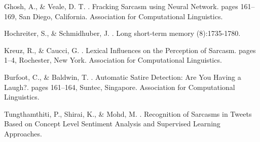 \documentclass[11pt]{article}
\begin{document}
\begin{thebibliography}{}

Ghosh, A., \& Veale, D. T.
.
\newblock Fracking Sarcasm using Neural Network.
\newblock pages 161–169, San Diego, California. Association for Computational Linguistics.

Hochreiter, S., \& Schmidhuber, J.
.
\newblock Long short-term memory
(8):1735-1780.

Kreuz, R., \& Caucci, G.
.
\newblock Lexical Influences on the Perception of Sarcasm.
\newblock pages 1–4, Rochester, New York. Association for Computational Linguistics.

Burfoot, C., \& Baldwin, T.
.
\newblock Automatic Satire Detection: Are You Having a Laugh?.
\newblock pages 161–164, Suntec, Singapore. Association for Computational Linguistics.

Tungthamthiti, P., Shirai, K., \& Mohd, M.
.
\newblock Recognition of Sarcasms in Tweets Based on Concept Level Sentiment Analysis and Supervised Learning Approaches.

\end{thebibliography}
\end{document}
